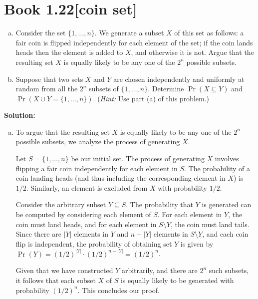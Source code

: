 \documentclass[11pt]{article}
\newcommand\size[1]{\left|#1\right|} %
\newenvironment{question}[2]
{\newpage\section{#1\texorpdfstring{\hfill}{horizontal spacing}{\rm\normalsize #2}}}{}
\newenvironment{solution}
{\textbf{Solution: }\color{blue}}
{\color{black}}
\begin{document}

\begin{question}{Book 1.22}{[coin set]}

\begin{enumerate}[(a)]
    \item Consider the set \(\{1, \ldots, n\}\). We generate a subset \(X\) of this set as follows: a fair coin is flipped independently for each element of the set; if the coin lands heads then the element is added to \(X\), and otherwise it is not. Argue that the resulting set \(X\) is equally likely to be any one of the \(2^n\) possible subsets.
    
    \item Suppose that two sets \(X\) and \(Y\) are chosen independently and uniformly at random from all the \(2^n\) subsets of \(\{1, \ldots, n\}\). Determine \(\Pr(X\subseteq Y)\) and \(\Pr(X \cup Y = \{1,\ldots,n\})\). (\emph{Hint:} Use part (a) of this problem.)
\end{enumerate}

\begin{solution}

\begin{enumerate}[(a)]
    \item To argue that the resulting set \(X\) is equally likely to be any one of the \(2^n\) possible subsets, we analyze the process of generating \(X\).

    Let \(S=\{1,\ldots,n\}\) be our initial set. The process of generating \(X\) involves flipping a fair coin independently for each element in \(S\). The probability of a coin landing heads (and thus including the corresponding element in \(X\)) is \(1/2\). Similarly, an element is excluded from \(X\) with probability \(1/2\).

    Consider the arbitrary subset \(Y \subseteq S\). The probability that \(Y\) is generated can be computed by considering each element of \(S\). For each element in \(Y\), the coin must land heads, and for each element in \(S \setminus Y\), the coin must land tails. Since there are \(\size{Y}\) elements in \(Y\) and \(n-\size{Y}\) elements in \(S \setminus Y\), and each coin flip is independent, the probability of obtaining set \(Y\) is given by \(\Pr(Y) = (1/2)^{\size{Y}} \cdot (1/2)^{n-\size{Y}} = (1/2)^n\).

    Given that we have constructed \(Y\) arbitrarily, and there are \(2^n\) such subsets, it follows that each subset \(X\) of \(S\) is equally likely to be generated with probability \((1/2)^n\). This concludes our proof.


\end{enumerate}
\end{solution}
\end{question}
\end{document}
